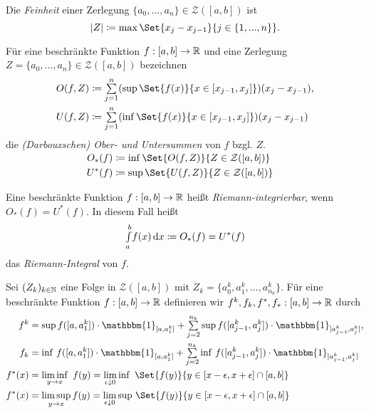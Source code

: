 \documentclass{cheat-sheet}
\newcommand{\ind}{\mathbbm{1}} %
\begin{document}
\begin{defn}
  Die \emph{Feinheit} einer Zerlegung $\{ a_0, ..., a_n \} \in \mathcal{Z}([a, b])$ ist
  \[ \left|Z\right| \coloneqq \max \Set{ x_j - x_{j-1} }{ j \in \{ 1, ..., n \} }. \]
\end{defn}

\begin{defn}
  Für eine beschränkte Funktion $f : [a, b] \to \mathbb{R}$ und eine Zerlegung $Z = \{ a_0, ..., a_n \} \in \mathcal{Z}([a, b])$ bezeichnen
  \begin{align*}
    O(f, Z) &\coloneqq \sum_{j=1}^n (\sup \Set{ f(x) }{ x \in [x_{j-1}, x_j] })(x_j - x_{j-1}),\\
    U(f, Z) &\coloneqq \sum_{j=1}^n (\inf \Set{ f(x) }{ x \in [x_{j-1}, x_j] })(x_j - x_{j-1})
  \end{align*}
  die \emph{(Darbouxschen) Ober- und Untersummen} von $f$ bzgl. $Z$.
\end{defn}

\begin{nota}
  \begin{align*}\\[-24pt]
    O_*(f) &\coloneqq \inf \Set{ O(f, Z) }{ Z \in \mathcal{Z}([a, b]) }\\
    U^*(f) &\coloneqq \sup \Set{ U(f, Z) }{ Z \in \mathcal{Z}([a, b]) }\\
  \end{align*}
\end{nota}

\begin{defn}
  Eine beschränkte Funktion $f : [a, b] \to \mathbb{R}$ heißt \emph{Riemann-integrierbar}, wenn $O_*(f) = U^*(f)$. In diesem Fall heißt
  \[ {\textstyle \int\limits_{a}^{b}} f(x) \,\mathrm{d} x \coloneqq O_*(f) = U^*(f) \]
  das \emph{Riemann-Integral} von $f$.
\end{defn}

\begin{nota}
  Sei $(Z_k)_{k \in \mathbb{N}}$ eine Folge in $\mathcal{Z}([a, b])$ mit $Z_k = \{ a_0^k, a_1^k, ..., a^k_{n_k} \}$. Für eine beschränkte Funktion $f : [a, b] \to \mathbb{R}$ definieren wir $f^k, f_k, f^*, f_* : [a, b] \to \mathbb{R}$ durch
  \begin{align*}
    f^k &= \sup f([a, a_1^k]) \cdot \ind_{[a, a_1^k]} + \sum_{j=2}^{n_k} \sup f([a_{j-1}^k, a_j^k]) \cdot \ind_{]a_{j-1}^k, a_j^k]},\\
    f_k &= \inf \, f([a, a_1^k]) \cdot \ind_{[a, a_1^k]} + \sum_{j=2}^{n_k} \inf \, f([a_{j-1}^k, a_j^k]) \cdot \ind_{]a_{j-1}^k, a_j^k]}\\
    f^*(x) &= \liminf_{y \to x}\,\, f(y) = \lim_{\epsilon \downarrow 0} \inf\,\, \Set{ f(y) }{ y \in [x-\epsilon, x+\epsilon] \cap [a, b]}\\
    f^*(x) &= \limsup_{y \to x} f(y) = \lim_{\epsilon \downarrow 0} \sup \, \Set{ f(y) }{ y \in [x-\epsilon, x+\epsilon] \cap [a, b]}
  \end{align*}
\end{nota}
\end{document}
